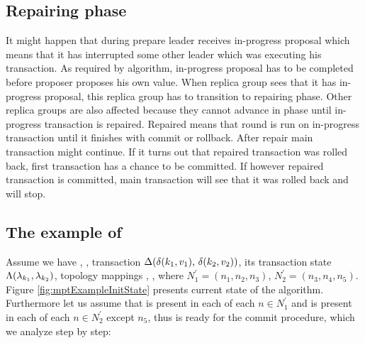 \subsection{Repairing phase}
It might happen that during prepare leader receives in-progress proposal which means that it has interrupted some other leader which was executing his transaction. As required by \paxos algorithm, in-progress proposal has to be completed before proposer proposes his own value. When replica group sees that it has in-progress proposal, this replica group has to transition to repairing phase. 
Other replica groups are also affected because they cannot advance in phase until in-progress transaction is repaired. Repaired means that \mpt round is run on in-progress transaction until it finishes with commit or rollback. 
After repair main transaction might continue. If it turns out that repaired transaction was rolled back, first transaction has a chance to be committed. If however repaired transaction is committed, main transaction will see that it was rolled back and will stop.




\subsection{The example of \mpt}
Assume we have 
, , transaction
$\text{$\Delta$}(\text{$\delta(k_1, v_1)$, $\delta(k_2, v_2)$})$,  its transaction state
$\text{$\Lambda$}(\text{$\lambda_{k_1}$}, \text{$\lambda_{k_2}$})$, topology mappings
, 
, 
where $N^'_1=(n_1, n_2, n_3)$, 
$N^'_2=(n_3,n_4,n_5)$. Figure \ref{fig:mptExampleInitState} presents current state of the algorithm. Furthermore let us assume that  is present in each \txStorage of each $n\in N^'_1$ and  is present in each \txStorage of each $n\in N^'_2$ except $n_5$, thus \transaction is ready for the commit procedure, which we analyze step by step:

